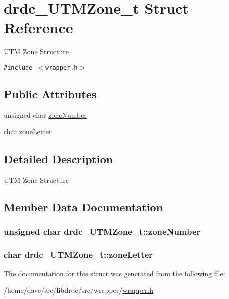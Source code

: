 \hypertarget{structdrdc__UTMZone__t}{
\section{drdc\_\-UTMZone\_\-t Struct Reference}
\label{structdrdc__UTMZone__t}
}
UTM Zone Structure  


{\tt \#include $<$wrapper.h$>$}

\subsection*{Public Attributes}
\begin{CompactItemize}
\item 
unsigned char \hyperlink{structdrdc__UTMZone__t_39a4f401667ec757e9077796c10dd3bf}{zoneNumber}
\item 
char \hyperlink{structdrdc__UTMZone__t_a1c632b27837291ecd16863145997c21}{zoneLetter}
\end{CompactItemize}


\subsection{Detailed Description}
UTM Zone Structure 



\subsection{Member Data Documentation}
\hypertarget{structdrdc__UTMZone__t_39a4f401667ec757e9077796c10dd3bf}{
\subsubsection[zoneNumber]{\setlength{\rightskip}{0pt plus 5cm}unsigned char {\bf drdc\_\-UTMZone\_\-t::zoneNumber}}}
\label{structdrdc__UTMZone__t_39a4f401667ec757e9077796c10dd3bf}


\hypertarget{structdrdc__UTMZone__t_a1c632b27837291ecd16863145997c21}{
\subsubsection[zoneLetter]{\setlength{\rightskip}{0pt plus 5cm}char {\bf drdc\_\-UTMZone\_\-t::zoneLetter}}}
\label{structdrdc__UTMZone__t_a1c632b27837291ecd16863145997c21}




The documentation for this struct was generated from the following file:\begin{CompactItemize}
\item 
/home/dave/src/libdrdc/src/wrapper/\hyperlink{wrapper_8h}{wrapper.h}\end{CompactItemize}
